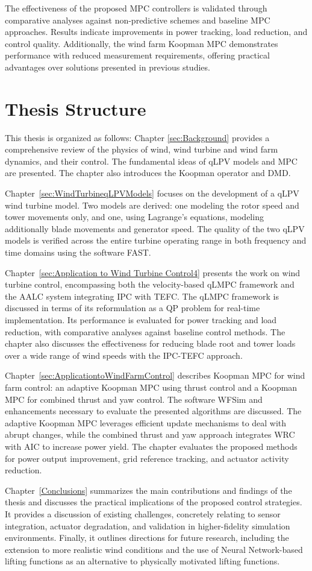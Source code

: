 The effectiveness of the proposed MPC controllers is validated through comparative analyses against non-predictive schemes and baseline MPC approaches. Results indicate improvements in power tracking, load reduction, and control quality. Additionally, the wind farm Koopman MPC demonstrates performance with reduced measurement requirements, offering practical advantages over solutions presented in previous studies.

\section{Thesis Structure}
This thesis is organized as follows: Chapter \ref{sec:Background} provides a comprehensive review of the physics of wind, wind turbine and wind farm dynamics, and their control. The fundamental ideas of qLPV models and MPC are presented. The chapter also introduces the Koopman operator and DMD.

Chapter~\ref{sec:WindTurbineqLPVModels} focuses on the development of a qLPV wind turbine model. Two models are derived: one modeling the rotor speed and tower movements only, and one, using Lagrange's equations, modeling additionally blade movements and generator speed. The quality of the two qLPV models is verified across the entire turbine operating range in both frequency and time domains using the software FAST.

Chapter~\ref{sec:Application to Wind Turbine Control4} presents the work on wind turbine control, encompassing both the velocity-based qLMPC framework and the AALC system integrating IPC with TEFC. The qLMPC framework is discussed in terms of its reformulation as a  QP problem for real-time implementation. Its performance is evaluated for power tracking and load reduction, with comparative analyses against baseline control methods. The chapter also discusses the effectiveness for reducing blade root and tower loads over a wide range of wind speeds with the IPC-TEFC approach.   

Chapter~\ref{sec:ApplicationtoWindFarmControl} describes Koopman MPC for wind farm control: an adaptive Koopman MPC using thrust control and a Koopman MPC for combined thrust and yaw control. The software WFSim and enhancements necessary to evaluate the presented algorithms are discussed. The adaptive Koopman MPC leverages efficient update mechanisms to deal with abrupt changes, while the combined thrust and yaw approach integrates WRC with AIC to increase power yield. The chapter evaluates the proposed methods for power output improvement, grid reference tracking, and actuator activity reduction.

Chapter~\ref{Conclusions} summarizes the main contributions and findings of the thesis 
and discusses the practical implications of the proposed control strategies. It provides 
a discussion of existing challenges, concretely relating to sensor 
integration, actuator degradation, and validation in higher-fidelity simulation 
environments. Finally, it outlines directions for future research, including the 
extension to more realistic wind conditions and the use of Neural Network-based 
lifting functions as an alternative to physically motivated lifting functions.